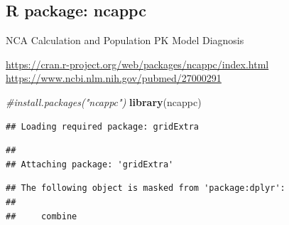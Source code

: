 \documentclass[]{krantz}
\makeatletter
\newenvironment{Shaded}{\begin{snugshade}}{\end{snugshade}}
\newcommand{\KeywordTok}[1]{\textcolor[rgb]{0.13,0.29,0.53}{\textbf{#1}}}
\newcommand{\DataTypeTok}[1]{\textcolor[rgb]{0.13,0.29,0.53}{#1}}
\newcommand{\CharTok}[1]{\textcolor[rgb]{0.31,0.60,0.02}{#1}}
\newcommand{\StringTok}[1]{\textcolor[rgb]{0.31,0.60,0.02}{#1}}
\newcommand{\CommentTok}[1]{\textcolor[rgb]{0.56,0.35,0.01}{\textit{#1}}}
\newcommand{\OtherTok}[1]{\textcolor[rgb]{0.56,0.35,0.01}{#1}}
\newcommand{\OperatorTok}[1]{\textcolor[rgb]{0.81,0.36,0.00}{\textbf{#1}}}
\newcommand{\NormalTok}[1]{#1}
\newenvironment{kframe}{%
\medskip{}
\setlength{\fboxsep}{.8em}
 \def\at@end@of@kframe{}%
 \ifinner\ifhmode%
  \def\at@end@of@kframe{\end{minipage}}%
  \begin{minipage}{\columnwidth}%
 \fi\fi%
 \def\FrameCommand##1{\hskip\@totalleftmargin \hskip-\fboxsep
 \colorbox{shadecolor}{##1}\hskip-\fboxsep
     \hskip-\linewidth \hskip-\@totalleftmargin \hskip\columnwidth}%
 \MakeFramed {\advance\hsize-\width
   \@totalleftmargin\z@ \linewidth\hsize
   \@setminipage}}%
 {\par\unskip\endMakeFramed%
 \at@end@of@kframe}
\renewenvironment{Shaded}{\begin{kframe}}{\end{kframe}}
\theoremstyle{definition}
\theoremstyle{definition}
\theoremstyle{definition}
\theoremstyle{remark}
\makeatother
\begin{document}
\subsection{R package: ncappc}\label{r-package-ncappc}

NCA Calculation and Population PK Model Diagnosis \citep{Acharya201683}

\url{https://cran.r-project.org/web/packages/ncappc/index.html}
\url{https://www.ncbi.nlm.nih.gov/pubmed/27000291}

\begin{Shaded}
\begin{Highlighting}[]
\CommentTok{#install.packages("ncappc")}
\KeywordTok{library}\NormalTok{(ncappc)}
\end{Highlighting}
\end{Shaded}

\begin{verbatim}
## Loading required package: gridExtra
\end{verbatim}

\begin{verbatim}
## 
## Attaching package: 'gridExtra'
\end{verbatim}

\begin{verbatim}
## The following object is masked from 'package:dplyr':
## 
##     combine
\end{verbatim}

\begin{Shaded}
\end{Shaded}
\end{document}
